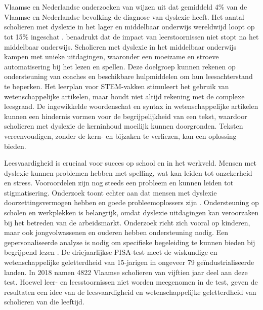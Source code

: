 \section{}%
\label{sec:probleemstelling}

Vlaamse en Nederlandse onderzoeken van \textcite{Wentink2008, Desoete2017} wijzen uit dat gemiddeld 4\% van de Vlaamse en Nederlandse bevolking de diagnose van dyslexie heeft. Het aantal scholieren met dyslexie in het lager en middelbaar onderwijs wereldwijd loopt op tot 15\% ingeschat \autocite{Bonte2020, VanDerMeer2022}. \textcite{Lissens2020} benadrukt dat de impact van leerstoornissen niet stopt na het middelbaar onderwijs. Scholieren met dyslexie in het middelbaar onderwijs kampen met unieke uitdagingen, waaronder een moeizame en stroeve automatisering bij het lezen en spellen. Deze doelgroep kunnen rekenen op ondersteuning van coaches en beschikbare hulpmiddelen om hun leesachterstand te beperken. Het leerplan voor STEM-vakken stimuleert het gebruik van wetenschappelijke artikelen, maar houdt niet altijd rekening met de complexe leesgraad. De ingewikkelde woordenschat en syntax in wetenschappelijke artikelen kunnen een hindernis vormen voor de begrijpelijkheid van een tekst, waardoor scholieren met dyslexie de kerninhoud moeilijk kunnen doorgronden. Teksten vereenvoudigen, zonder de kern- en bijzaken te verliezen, kan een oplossing bieden. 

Leesvaardigheid is cruciaal voor succes op school en in het werkveld. Mensen met dyslexie kunnen problemen hebben met spelling, wat kan leiden tot onzekerheid en stress. Vooroordelen zijn nog steeds een probleem en kunnen leiden tot stigmatisering. Onderzoek toont echter aan dat mensen met dyslexie doorzettingsvermogen hebben en goede probleemoplossers zijn \autocite{Ghesquiere2018, Lissens2020, Bonte2020}. Ondersteuning op scholen en werkplekken is belangrijk, omdat dyslexie uitdagingen kan veroorzaken bij het betreden van de arbeidsmarkt. Onderzoek richt zich vooral op kinderen, maar ook jongvolwassenen en ouderen hebben ondersteuning nodig. Een gepersonaliseerde analyse is nodig om specifieke begeleiding te kunnen bieden bij begrijpend lezen \autocite{VanVreckem2015, Lissens2020}. De driejaarlijkse PISA-test meet de wiskundige en wetenschappelijke geletterdheid van 15-jarigen in ongeveer 79 geïndustrialiseerde landen. In 2018 namen 4822 Vlaamse scholieren van vijftien jaar deel aan deze test. Hoewel leer- en leesstoornissen niet worden meegenomen in de test, geven de resultaten een idee van de leesvaardigheid en wetenschappelijke geletterdheid van scholieren van die leeftijd. 

